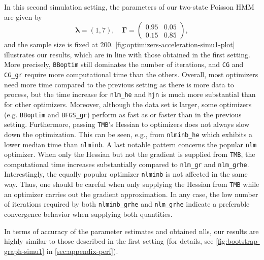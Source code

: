 \documentclass[]{interact}\usepackage[]{graphicx}\usepackage[dvipsnames]{xcolor}
\theoremstyle{plain}%
\theoremstyle{definition}
\theoremstyle{remark}
\begin{document}
\noindent In this second simulation setting, the parameters of our two-state Poisson HMM are given by
\begin{equation*}
\bm{\lambda} = (1, 7), \quad
\bm{\Gamma} = \begin{pmatrix} 0.95 & 0.05 \\ 0.15 & 0.85 \end{pmatrix},
\end{equation*}
and the sample size is fixed at 200.
 \autoref{fig:optimizers-acceleration-simu1-plot} illustrates our results, which are in line with those obtained in the first setting. More precisely, \texttt{BBoptim} still dominates the number of iterations, and \texttt{CG} and \texttt{CG\_gr} require more computational time than the others.
Overall, most optimizers need more time compared to the previous setting as there is more data to process, but the time increase for \texttt{nlm\_he} and \texttt{hjn} is much more substantial than for other optimizers.
Moreover, although the data set is larger, some optimizers (e.g. \texttt{BBoptim} and \texttt{BFGS\_gr}) perform as fast as or faster than in the previous setting.
Furthermore, passing {\tt{TMB}}'s Hessian to optimizers does not always slow down the optimization. This can be seen, e.g., from \texttt{nlminb\_he} which exhibits a lower median time than \texttt{nlminb}. A last notable pattern concerns the popular \texttt{nlm} optimizer. When only the Hessian but not the gradient is supplied from \texttt{TMB}, the computational time increases substantially compared to \texttt{nlm\_gr} and \texttt{nlm\_grhe}. Interestingly, the equally popular optimizer \texttt{nlminb} is not affected in the same way. Thus, one should be careful when only supplying the Hessian from \texttt{TMB} while an optimizer carries out the gradient approximation. In any case, the low number of iterations required by both \texttt{nlminb\_grhe} and \texttt{nlm\_grhe} indicate a preferable convergence behavior when supplying both quantities.

In terms of accuracy of the parameter estimates and obtained nlls, our results are highly similar to those described in the first setting (for details, see \autoref{fig:bootstrap-graph-simu1} in \autoref{sec:appendix-perf}).
\end{document}
